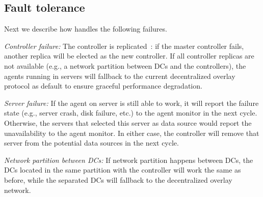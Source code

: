 \subsection{Fault tolerance}
\label{subsec:system:fault}
Next we describe how \name handles the following failures.

\begin{packedenumerate}
\item \emph{Controller failure:} The \name controller is
replicated~\cite{lamport1998part}: if the master controller fails,
another replica will be elected as the new controller. If all
controller replicas are not available (e.g., a network partition
between DCs and the controllers), the agents running in servers will
fallback to the current decentralized overlay protocol as default to
ensure graceful performance degradation.
\item \emph{Server failure:} If the agent on server is still able to
work, it will report the failure state (e.g., server crash, disk
failure, etc.) to the agent monitor in the next cycle. Otherwise, the
servers that selected this server as data source would report the
unavailability to the agent monitor. In either case, the controller
will remove that server from the potential data sources in the next
cycle.
\item \emph{Network partition between DCs:}
If network partition happens between DCs, the DCs located in the same
partition with the controller will work the same as before, while the
separated DCs will fallback to the decentralized overlay network.
\end{packedenumerate}



